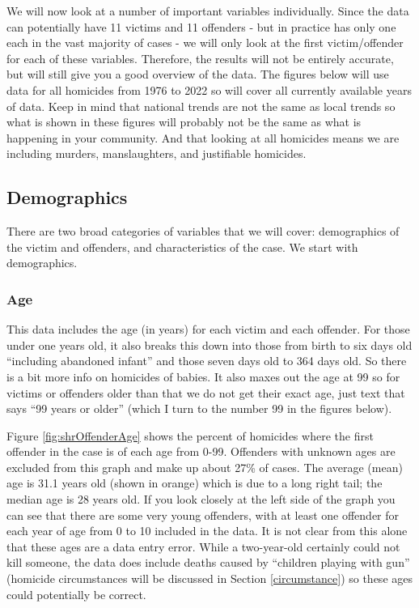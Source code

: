 \documentclass[
]{krantz}
\begin{document}
We will now look at a number of important variables
individually. Since the data can potentially have 11 victims
and 11 offenders - but in practice has only one each in the
vast majority of cases - we will only look at the first
victim/offender for each of these variables. Therefore, the
results will not be entirely accurate, but will still give
you a good overview of the data. The figures below will use
data for all homicides from 1976 to 2022 so will cover all
currently available years of data. Keep in mind that
national trends are not the same as local trends so what is
shown in these figures will probably not be the same as what
is happening in your community. And that looking at all
homicides means we are including murders, manslaughters, and
justifiable homicides.

\subsection{Demographics}\label{demographics}

There are two broad categories of variables that we will
cover: demographics of the victim and offenders, and
characteristics of the case. We start with demographics.

\subsubsection{Age}\label{age-1}

This data includes the age (in years) for each victim and
each offender. For those under one years old, it also breaks
this down into those from birth to six days old ``including
abandoned infant'' and those seven days old to 364 days old.
So there is a bit more info on homicides of babies. It also
maxes out the age at 99 so for victims or offenders older
than that we do not get their exact age, just text that says
``99 years or older'' (which I turn to the number 99 in the
figures below).

Figure \ref{fig:shrOffenderAge} shows the percent of
homicides where the first offender in the case is of each
age from 0-99. Offenders with unknown ages are excluded from
this graph and make up about 27\% of cases. The average
(mean) age is 31.1 years old (shown in orange) which is due
to a long right tail; the median age is 28 years old. If you
look closely at the left side of the graph you can see that
there are some very young offenders, with at least one
offender for each year of age from 0 to 10 included in the
data. It is not clear from this alone that these ages are a
data entry error. While a two-year-old certainly could not
kill someone, the data does include deaths caused by
``children playing with gun'' (homicide circumstances will
be discussed in Section \ref{circumstance}) so these ages
could potentially be correct.
\end{document}
